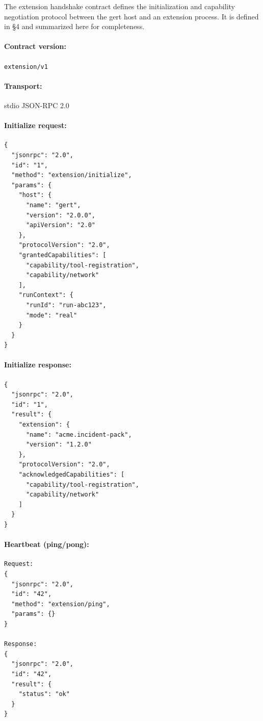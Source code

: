 The extension handshake contract defines the initialization and capability
negotiation protocol between the gert host and an extension process.  It is
defined in §4 and summarized here for completeness.

\paragraph{Contract version:} \texttt{extension/v1}

\paragraph{Transport:} stdio JSON-RPC 2.0

\paragraph{Initialize request:}

\begin{verbatim}
{
  "jsonrpc": "2.0",
  "id": "1",
  "method": "extension/initialize",
  "params": {
    "host": {
      "name": "gert",
      "version": "2.0.0",
      "apiVersion": "2.0"
    },
    "protocolVersion": "2.0",
    "grantedCapabilities": [
      "capability/tool-registration",
      "capability/network"
    ],
    "runContext": {
      "runId": "run-abc123",
      "mode": "real"
    }
  }
}
\end{verbatim}

\paragraph{Initialize response:}

\begin{verbatim}
{
  "jsonrpc": "2.0",
  "id": "1",
  "result": {
    "extension": {
      "name": "acme.incident-pack",
      "version": "1.2.0"
    },
    "protocolVersion": "2.0",
    "acknowledgedCapabilities": [
      "capability/tool-registration",
      "capability/network"
    ]
  }
}
\end{verbatim}

\paragraph{Heartbeat (ping/pong):}

\begin{verbatim}
Request:
{
  "jsonrpc": "2.0",
  "id": "42",
  "method": "extension/ping",
  "params": {}
}

Response:
{
  "jsonrpc": "2.0",
  "id": "42",
  "result": {
    "status": "ok"
  }
}
\end{verbatim}

